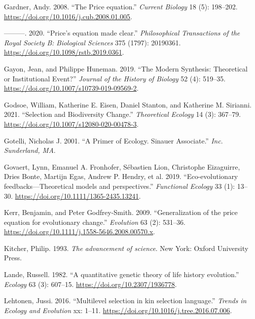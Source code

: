 \documentclass[
]{article}
\newlength{\cslhangindent}
\newlength{\cslentryspacingunit} %
\newenvironment{CSLReferences}[2] %
 {%
  \setlength{\parindent}{0pt}
  \ifodd #1
  \let\oldpar\par
  \def\par{\hangindent=\cslhangindent\oldpar}
  \fi
  \setlength{\parskip}{#2\cslentryspacingunit}
 }%
 {}
\begin{document}
\begin{CSLReferences}{1}{0}
\leavevmode{}%
Gardner, Andy. 2008. {``{The Price equation}.''} \emph{Current Biology}
18 (5): 198--202. \url{https://doi.org/10.1016/j.cub.2008.01.005}.

\leavevmode{}%
---------. 2020. {``{Price's equation made clear}.''}
\emph{Philosophical Transactions of the Royal Society B: Biological
Sciences} 375 (1797): 20190361.
\url{https://doi.org/10.1098/rstb.2019.0361}.

\leavevmode{}%
Gayon, Jean, and Philippe Huneman. 2019. {``The Modern Synthesis:
Theoretical or Institutional Event?''} \emph{Journal of the History of
Biology} 52 (4): 519--35.
\url{https://doi.org/10.1007/s10739-019-09569-2}.

\leavevmode{}%
Godsoe, William, Katherine E. Eisen, Daniel Stanton, and Katherine M.
Sirianni. 2021. {``Selection and Biodiversity Change.''}
\emph{Theoretical Ecology} 14 (3): 367--79.
\url{https://doi.org/10.1007/s12080-020-00478-3}.

\leavevmode{}%
Gotelli, Nicholas J. 2001. {``A Primer of Ecology. Sinauer Associate.''}
\emph{Inc. Sunderland, MA}.

\leavevmode{}%
Govaert, Lynn, Emanuel A. Fronhofer, Sébastien Lion, Christophe
Eizaguirre, Dries Bonte, Martijn Egas, Andrew P. Hendry, et al. 2019.
{``{Eco-evolutionary feedbacks---Theoretical models and
perspectives}.''} \emph{Functional Ecology} 33 (1): 13--30.
\url{https://doi.org/10.1111/1365-2435.13241}.

\leavevmode{}%
Kerr, Benjamin, and Peter Godfrey-Smith. 2009. {``{Generalization of the
price equation for evolutionary change}.''} \emph{Evolution} 63 (2):
531--36. \url{https://doi.org/10.1111/j.1558-5646.2008.00570.x}.

\leavevmode{}%
Kitcher, Philip. 1993. \emph{{The advancement of science}}. New York:
Oxford University Press.

\leavevmode{}%
Lande, Russell. 1982. {``{A quantitative genetic theory of life history
evolution}.''} \emph{Ecology} 63 (3): 607--15.
\url{https://doi.org/10.2307/1936778}.

\leavevmode{}%
Lehtonen, Jussi. 2016. {``{Multilevel selection in kin selection
language}.''} \emph{Trends in Ecology and Evolution} xx: 1--11.
\url{https://doi.org/10.1016/j.tree.2016.07.006}.


\end{CSLReferences}
\end{document}
